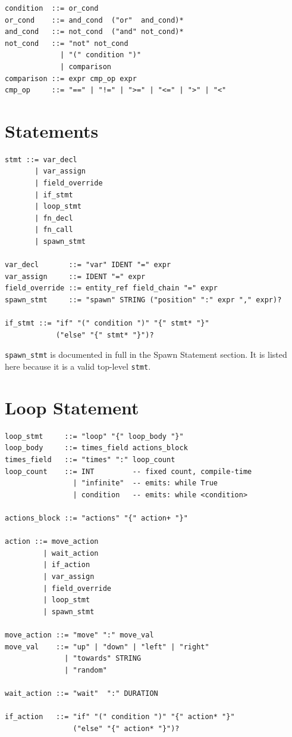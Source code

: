 \documentclass[12pt,a4paper]{article}
\begin{document}
\begin{lstlisting}[style=bnf]
condition  ::= or_cond
or_cond    ::= and_cond  ("or"  and_cond)*
and_cond   ::= not_cond  ("and" not_cond)*
not_cond   ::= "not" not_cond
             | "(" condition ")"
             | comparison
comparison ::= expr cmp_op expr
cmp_op     ::= "==" | "!=" | ">=" | "<=" | ">" | "<"
\end{lstlisting}

\section{Statements}

\begin{lstlisting}[style=bnf]
stmt ::= var_decl
       | var_assign
       | field_override
       | if_stmt
       | loop_stmt
       | fn_decl
       | fn_call
       | spawn_stmt

var_decl       ::= "var" IDENT "=" expr
var_assign     ::= IDENT "=" expr
field_override ::= entity_ref field_chain "=" expr
spawn_stmt     ::= "spawn" STRING ("position" ":" expr "," expr)?

if_stmt ::= "if" "(" condition ")" "{" stmt* "}"
            ("else" "{" stmt* "}")?
\end{lstlisting}

\begin{cbox}
\texttt{spawn\_stmt} is documented in full in the Spawn Statement section.
It is listed here because it is a valid top-level \texttt{stmt}.
\end{cbox}

\section{Loop Statement}

\begin{lstlisting}[style=bnf]
loop_stmt     ::= "loop" "{" loop_body "}"
loop_body     ::= times_field actions_block
times_field   ::= "times" ":" loop_count
loop_count    ::= INT         -- fixed count, compile-time
                | "infinite"  -- emits: while True
                | condition   -- emits: while <condition>

actions_block ::= "actions" "{" action+ "}"

action ::= move_action
         | wait_action
         | if_action
         | var_assign
         | field_override
         | loop_stmt
         | spawn_stmt

move_action ::= "move" ":" move_val
move_val    ::= "up" | "down" | "left" | "right"
              | "towards" STRING
              | "random"

wait_action ::= "wait"  ":" DURATION

if_action   ::= "if" "(" condition ")" "{" action* "}"
                ("else" "{" action* "}")?
\end{lstlisting}
\end{document}
